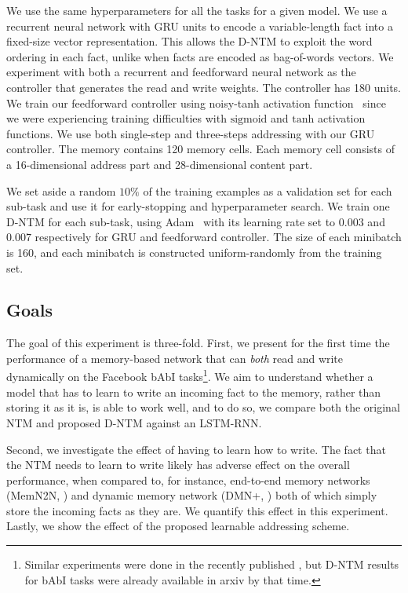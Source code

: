 \documentclass[12pt]{article}
\begin{document}
We use the same hyperparameters for all the tasks for a given model. We use a recurrent neural network with GRU units to encode a variable-length
fact into a fixed-size vector representation. This allows the D-NTM to exploit
the word ordering in each fact, unlike when facts are encoded as bag-of-words
vectors. We experiment with both a recurrent and feedforward neural network as the controller that generates the read and write weights. The controller has 180 units.
We train our feedforward controller using noisy-tanh activation function~\citep{gulcehre2016noisy} since we were experiencing training difficulties with $\text{sigmoid}$ and $\text{tanh}$ activation functions. We use both single-step and three-steps addressing with our GRU controller. The memory contains 120 memory cells. Each memory cell consists of a 16-dimensional address part and 28-dimensional content part.

We set aside a random $10\%$ of the training examples as a validation set for each
sub-task and use it for early-stopping and hyperparameter search. We train one
D-NTM for each sub-task, using Adam~\citep{adam} with its learning rate set to
$0.003$ and $0.007$ respectively for GRU and feedforward controller. The size of each 
minibatch is 160, and each minibatch is constructed uniform-randomly from the training set. 


\subsection{Goals}

The goal of this experiment is three-fold. First, we present for the first time the performance of a memory-based network that can {\it both} read and write dynamically on the Facebook bAbI tasks\footnote{Similar experiments were done in the recently published \citep{graves2016hybrid}, but D-NTM results for bAbI tasks were already available in arxiv by that time.}. We aim to understand whether a model that has to learn to write an incoming fact to the memory, rather than storing it as it is, is able to work well, and to do so, we compare both the original NTM and proposed D-NTM against an LSTM-RNN. 

Second, we investigate the effect of having to learn how to write. The fact that the NTM needs to learn to write likely has adverse effect on the overall performance, when compared to, for instance, end-to-end memory networks (MemN2N, \citep{sukhbaatarend}) and dynamic memory network (DMN+, \citep{dmn2}) both of which simply store the incoming facts as they are. We quantify this effect in this experiment. Lastly, we show the effect of the proposed learnable addressing scheme. 
\end{document}
